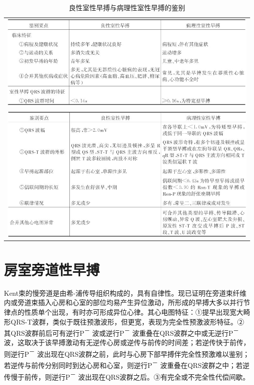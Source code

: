 \begin{longtable}{c}
  \caption{良性室性早搏与病理性室性早搏的鉴别}
  \label{tab11-3}\\
  \endfirsthead
  \caption[]{良性室性早搏与病理性室性早搏的鉴别}
  \endhead
\includegraphics[width=\textwidth,height=\textheight,keepaspectratio]{./images/Image00191.jpg}\\
\includegraphics[width=\textwidth,height=\textheight,keepaspectratio]{./images/Image00192.jpg}
\end{longtable}

\section{房室旁道性早搏}

Kent束的慢旁道是由希-浦传导组织构成的，具有自律性。现已证明在旁道束纤维内或旁道束插入心房和心室的部位均易产生异位激动，所形成的早搏大多以并行节律点的性质单个出现，有时亦可形成异位心律。其心电图特征：①提早出现宽大畸形QRS-T波群，类似于既往预激波形，但更宽，表现为完全性预激波形特征。②其QRS波群前后可有逆行P\textsuperscript{－}
波或逆行P\textsuperscript{－}
波重叠在QRS波群之中或无逆行P\textsuperscript{－}
波，这取决于该早搏激动有无逆传心房或逆传与前传的时间差；若逆传快于前传，则逆行P\textsuperscript{－}
波出现在QRS波群之前，此时与心房下部早搏伴完全性预激难以鉴别；若逆传与前传分别同时到达心房和心室，则逆行P\textsuperscript{－}
波重叠在QRS波群之中；若逆传慢于前传，则逆行P\textsuperscript{－}
波出现在QRS波群之后。③有完全或不完全性代偿间歇。

